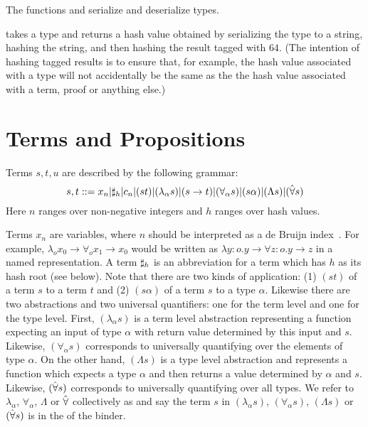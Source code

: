 The functions {} and {} serialize and deserialize types.

{} takes a type and returns a hash value obtained by serializing the type
to a string, hashing the string, and then hashing the result tagged with $64$.
(The intention of hashing tagged results is to ensure that, for example, the hash value
associated with a type will not accidentally be the same as the the hash value associated
with a term, proof or anything else.)

\section{Terms and Propositions}

Terms $s,t,u$ are described by the following grammar:
$$
s,t ::=  x_n |\mathbf{\sharp}_{h}|c_n|(st)|(\lambda_\alpha s)|(s\to t)|(\forall_\alpha s)|(s \alpha)|(\Lambda s)|(\hat{\forall} s)
$$
Here $n$ ranges over non-negative integers
and $h$ ranges over hash values.

Terms $x_n$ are variables,
where $n$ should be interpreted as a de Bruijn index~\cite{deBruijn72}.
For example, $\lambda_o x_0 \to \forall_o x_1\to x_0$
would be written as $\lambda y:o . y\to\forall z:o.y\to z$
in a named representation.
A term $\mathbf{\sharp}_{h}$ is an abbreviation for a term which has $h$ as its hash root (see {} below).
Note that there are two kinds of application:
(1) $(st)$ of a term $s$ to a term $t$ and
(2) $(s\alpha)$ of a term $s$ to a type $\alpha$.
Likewise there are two abstractions and two universal quantifiers:
one for the term level and one for the type level.
First, $(\lambda_\alpha s)$ is a term level abstraction representing
a function expecting an input of type $\alpha$ 
with return value determined by this input and $s$.
Likewise, $(\forall_\alpha s)$ corresponds to universally quantifying
over the elements of type $\alpha$.
On the other hand, $(\Lambda s)$ is a type level abstraction
and represents a function which expects a type $\alpha$
and then returns a value determined by $\alpha$ and $s$.
Likewise, $(\hat{\forall} s)$ corresponds to universally quantifying
over all types.
We refer to 
$\lambda_\alpha$, $\forall_\alpha$, $\Lambda$ or $\hat{\forall}$
collectively as {}
and say the term $s$ in
$(\lambda_\alpha s)$, $(\forall_\alpha s)$, $(\Lambda s)$ or $(\hat{\forall} s)$
is in the {} of the binder.

